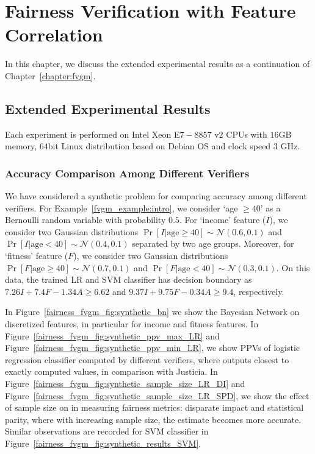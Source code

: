 \chapter{Fairness Verification with Feature Correlation}
	In this chapter, we discuss the extended experimental results as a continuation of Chapter~\ref{chapter:fvgm}.  


	\section{Extended Experimental Results}
	\label{fairness_fvgm_appendix:experiments}
	Each experiment is performed on Intel Xeon E$ 7-8857 $ v$2 $ CPUs with $ 16 $GB memory, $ 64 $bit Linux distribution based on Debian OS and clock speed $ 3 $ GHz.
	
	
	
		

	\subsection{Accuracy Comparison Among Different Verifiers}
	We have considered a synthetic problem for comparing accuracy among different verifiers. For Example~\ref{fvgm_example:intro}, we consider `age $ \ge 40 $' as a Bernoulli random  variable with probability $ 0.5 $. For `income' feature ($ I $), we consider two Gaussian distributions $ \Pr[I | \text{age} \ge 40] \sim \mathcal{N}(0.6, 0.1) $ and $ \Pr[I | \text{age} < 40] \sim \mathcal{N}(0.4, 0.1) $ separated by two age groups. Moreover, for `fitness' feature ($ F $), we consider two Gaussian distributions $ \Pr[F | \text{age} \ge 40] \sim \mathcal{N}(0.7, 0.1) $ and $ \Pr[F | \text{age} < 40] \sim \mathcal{N}(0.3, 0.1) $. On this data, the trained LR and SVM classifier has decision boundary as $ 7.26I + 7.4F - 1.34A \ge 6.62 $ and $ 9.37I + 9.75F - 0.34A \ge 9.4 $, respectively.
	
	
	In Figure~\ref{fairness_fvgm_fig:synthetic_bn} we show the Bayesian Network on discretized features, in particular for income and fitness features. In Figure~\ref{fairness_fvgm_fig:synthetic_ppv_max_LR} and Figure~\ref{fairness_fvgm_fig:synthetic_ppv_min_LR}, we show PPVs of logistic regression classifier computed by different verifiers, where  {\fvgm} outputs closest to exactly computed values, in comparison with Justicia. In Figure~\ref{fairness_fvgm_fig:synthetic_sample_size_LR_DI} and Figure~\ref{fairness_fvgm_fig:synthetic_sample_size_LR_SPD}, we show the effect of sample size on {\fvgm} in measuring fairness metrics: disparate impact and statistical parity, where with increasing sample size, the estimate becomes more accurate. Similar observations are recorded for SVM classifier in Figure~\ref{fairness_fvgm_fig:synthetic_results_SVM}.
	

